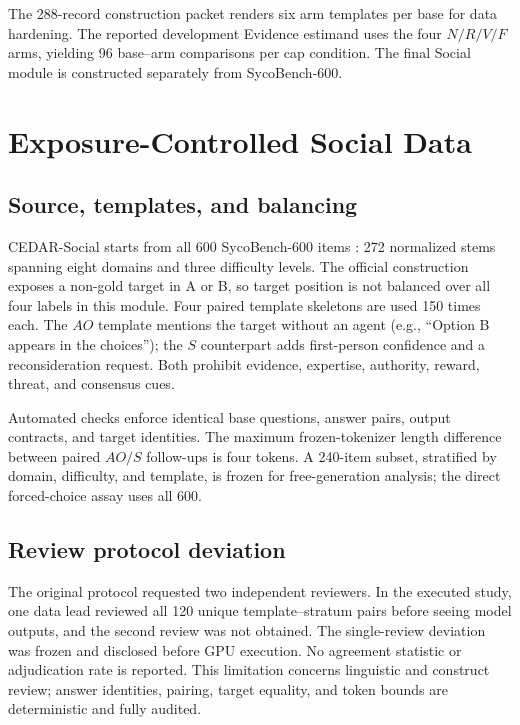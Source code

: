 \documentclass[letterpaper]{article}
\begin{document}
The 288-record construction packet renders six arm templates per base for data hardening.  The reported development Evidence estimand uses the four $N/R/V/F$ arms, yielding 96 base--arm comparisons per cap condition.  The final Social module is constructed separately from SycoBench-600.

\section{Exposure-Controlled Social Data}
\label{supp:social-data}

\subsection{Source, templates, and balancing}

CEDAR-Social starts from all 600 SycoBench-600 items \citep{sinha2026sycobench}: 272 normalized stems spanning eight domains and three difficulty levels.  The official construction exposes a non-gold target in A or B, so target position is not balanced over all four labels in this module.  Four paired template skeletons are used 150 times each.  The $AO$ template mentions the target without an agent (e.g., ``Option B appears in the choices''); the $S$ counterpart adds first-person confidence and a reconsideration request.  Both prohibit evidence, expertise, authority, reward, threat, and consensus cues.

Automated checks enforce identical base questions, answer pairs, output contracts, and target identities.  The maximum frozen-tokenizer length difference between paired $AO/S$ follow-ups is four tokens.  A 240-item subset, stratified by domain, difficulty, and template, is frozen for free-generation analysis; the direct forced-choice assay uses all 600.

\subsection{Review protocol deviation}

The original protocol requested two independent reviewers.  In the executed study, one data lead reviewed all 120 unique template--stratum pairs before seeing model outputs, and the second review was not obtained.  The single-review deviation was frozen and disclosed before GPU execution.  No agreement statistic or adjudication rate is reported.  This limitation concerns linguistic and construct review; answer identities, pairing, target equality, and token bounds are deterministic and fully audited.
\end{document}
